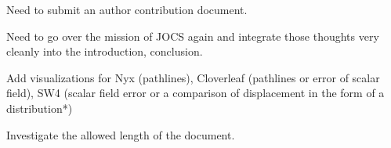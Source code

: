 Need to submit an author contribution document. 

Need to go over the mission of JOCS again and integrate those thoughts very cleanly into the introduction, conclusion. 

Add visualizations for Nyx (pathlines), Cloverleaf (pathlines or error of scalar field), SW4 (scalar field error or a comparison of displacement in the form of a distribution*)

Investigate the allowed length of the document. 
